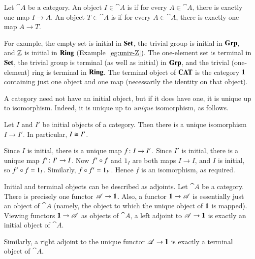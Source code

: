 \begin{defn}  
\label{defn:init-term}
Let $\cat{A}$ be a category.  An object $I \in \cat{A}$ is %
%
%
if for every $A \in \cat{A}$, there is exactly one map $I \to A$.  An
object $T \in \cat{A}$ is %
%
%
if for every $A \in \cat{A}$, there is exactly one map $A \to T$.
\end{defn}

For example, the empty set is initial in $\mathbf{Set}$, the trivial group is
initial in $\mathbf{Grp}$, and $\mathbb{Z}$%
%
%
is initial in $\mathbf{Ring}$ (Example~\ref{eg:univ-Z}).  The one-element set is
terminal in $\mathbf{Set}$, the trivial group is terminal (as well as initial) in
$\mathbf{Grp}$, and the trivial (one-element) ring is terminal in $\mathbf{Ring}$.  The
terminal object of $\mathbf{CAT}$ is the category $\mathbf{1}$ containing just one object
and one map (necessarily the identity on that object).

A category need not have an initial object, but if it does have one, it is
unique%
%
%
up to isomorphism.  Indeed, it is unique up to \emph{unique} isomorphism,
as follows.

\begin{lemma}
\label{lemma:init-unique}
Let $I$ and $I'$ be initial objects of a category.  Then there is a unique
isomorphism $I \to I'$.  In particular, $I \cong I'$.
\end{lemma}

\begin{pf}
Since $I$ is initial, there is a unique map $f\from I \to I'$.  Since $I'$
is initial, there is a unique map $f'\from I' \to I$.  Now $f' \mathbin{\circ} f$ and
$1_I$ are both maps $I \to I$, and $I$ is initial, so $f' \mathbin{\circ} f = 1_I$.
Similarly, $f \mathbin{\circ} f' = 1_{I'}$.  Hence $f$ is an isomorphism, as required.
\end{pf}

\begin{example}
\label{eg:init-term}
%
%
Initial and terminal objects can be described as adjoints.  Let $\cat{A}$
be a category.  There is precisely one functor $\mathscr{A} \to \mathbf{1}$.  Also, a
functor $\mathbf{1} \to \mathscr{A}$ is essentially just an object of $\cat{A}$
(namely, the object to which the unique object of $\mathbf{1}$ is mapped).
Viewing functors $\mathbf{1} \to \mathscr{A}$ as objects of $\cat{A}$, a left adjoint
to $\mathscr{A} \to \mathbf{1}$ is exactly an initial object of $\cat{A}$.

Similarly, a right adjoint to the unique functor $\mathscr{A} \to \mathbf{1}$ is
exactly a terminal object of $\cat{A}$.
\end{example}

